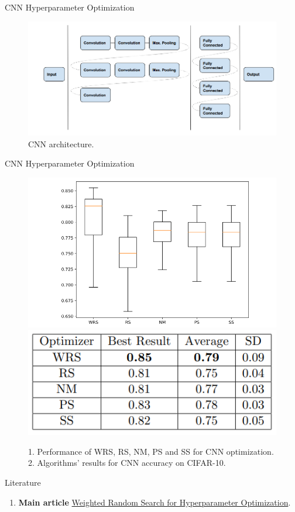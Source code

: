 \documentclass{beamer}
\begin{document}
\begin{frame}{CNN Hyperparameter Optimization}
    \begin{figure}
        \centering
        \includegraphics[scale=0.7]{images/wrs7.png}
        \caption{CNN architecture.}
        \label{fig:enter-label}
    \end{figure}
\end{frame}

\begin{frame}{CNN Hyperparameter Optimization}
    \begin{figure}
        \centering
        \includegraphics[scale=0.5]{images/wrs8.png}
        \includegraphics[scale=0.65]{images/wrs9.png}
        \caption{1. Performance of WRS, RS, NM, PS and SS for CNN optimization.
        2. Algorithms’ results for CNN accuracy on CIFAR-10.}
        \label{fig:enter-label}
    \end{figure}
\end{frame}


\begin{frame}{Literature}
    \begin{enumerate}
        \item \textbf{Main article} \href{https://arxiv.org/pdf/2004.01628.pdf}
        {Weighted Random Search for Hyperparameter Optimization}.
    \end{enumerate}
\end{frame}
\end{document}
